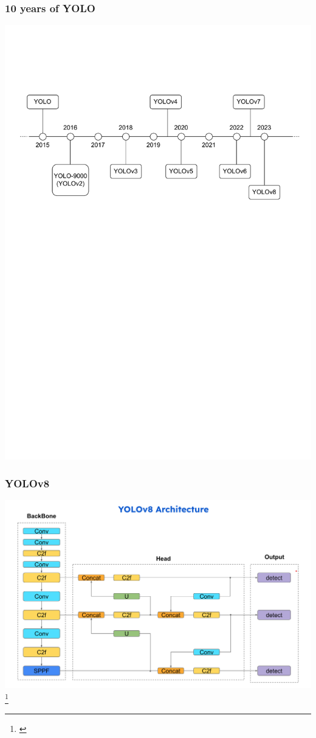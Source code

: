 \documentclass[serif]{beamer}  %
\begin{document}
\begin{frame}
\frametitle{10 years of YOLO}
\centering
\includegraphics[width=1\linewidth,keepaspectratio]{images/yolo_timeline.pdf}
\end{frame}

\begin{frame}
\frametitle{YOLOv8}
\centering
\includegraphics[width=1\linewidth]{images/YOLO_architecture_simple.png}
\footnote{\cite{sohan2024review}}
\end{frame}
\end{document}
